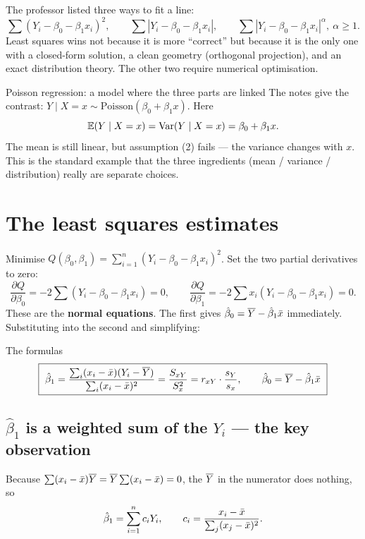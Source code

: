 \documentclass[11pt]{article}
\begin{document}
The professor listed three ways to fit a line:
\[
  \textstyle\sum (Y_i-\beta_0-\beta_1x_i)^2, \qquad
  \textstyle\sum |Y_i-\beta_0-\beta_1x_i|, \qquad
  \textstyle\sum |Y_i-\beta_0-\beta_1x_i|^\alpha,\ \alpha\ge 1 .
\]
Least squares wins not because it is more ``correct'' but because it is the only one with a
closed-form solution, a clean geometry (orthogonal projection), and an exact distribution
theory. The other two require numerical optimisation.

\begin{idea}{Poisson regression: a model where the three parts are linked}
The notes give the contrast: $Y \mid X=x \sim \text{Poisson}(\beta_0+\beta_1 x)$. Here
\[
  \mathbb{E}(Y\mid X=x) = \operatorname{Var}(Y\mid X=x) = \beta_0+\beta_1 x .
\]
The mean is still linear, but assumption (2) fails --- the variance changes with $x$. This
is the standard example that the three ingredients (mean / variance / distribution) really
are separate choices.
\end{idea}

\section{The least squares estimates}

Minimise $Q(\beta_0,\beta_1)=\sum_{i=1}^n (Y_i-\beta_0-\beta_1x_i)^2$. Set the two partial
derivatives to zero:
\[
  \frac{\partial Q}{\partial \beta_0} = -2\sum (Y_i-\beta_0-\beta_1x_i)=0,
  \qquad
  \frac{\partial Q}{\partial \beta_1} = -2\sum x_i(Y_i-\beta_0-\beta_1x_i)=0 .
\]
These are the \textbf{normal equations}. The first gives $\hat\beta_0=\overline{Y}-\hat\beta_1\bar{x}$
immediately. Substituting into the second and simplifying:

\begin{idea}{The formulas}
\[
  \boxed{\ \hat\beta_1 = \frac{\sum_{i}(x_i-\xbar)(Y_i-\Ybar)}{\sum_i (x_i-\xbar)^2}
  = \frac{S_{xY}}{S_x^2} = r_{xY}\cdot \frac{s_Y}{s_x}, \qquad
  \hat\beta_0 = \Ybar-\hat\beta_1\xbar\ }
\]
\end{idea}

\subsection{$\hat\beta_1$ is a weighted sum of the $Y_i$ --- the key observation}

Because $\sum(x_i-\bar{x})\overline{Y} = \overline{Y}\sum(x_i-\bar{x})=0$, the $\overline{Y}$ in the numerator does
nothing, so
\begin{equation}\label{eq:linear}
  \hat\beta_1 = \sum_{i=1}^n c_i Y_i, \qquad c_i = \frac{x_i-\bar{x}}{\sum_j (x_j-\bar{x})^2} .
\end{equation}
\end{document}
